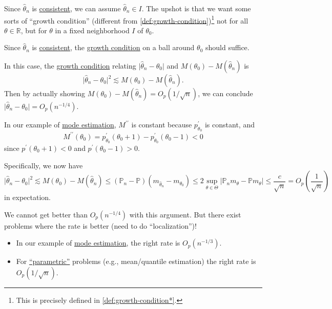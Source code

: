 Since \(\hat{\theta } _n \) is \hyperref[def:consistent]{consistent}, we can assume \(\hat{\theta } _n \in I\). The upshot is that we want some sorts of ``growth condition'' (different from \autoref{def:growth-condition})\footnote{This is precisely defined in \autoref{def:growth-condition*}.} not for all \(\theta \in \mathbb{R} \), but for \(\theta \) in a fixed neighborhood \(I\) of \(\theta _0\).

\begin{intuition}
	Since \(\hat{\theta } _n \) is \hyperref[def:consistent]{consistent}, the \hyperref[def:growth-condition*]{growth condition} on a ball around \(\theta _0\) should suffice.
\end{intuition}

In this case, the \hyperref[def:growth-condition*]{growth condition} relating \(\vert \hat{\theta } _n - \theta _0 \vert \) and \(M(\theta _0) - M(\hat{\theta} _n ) \) is
\[
	\vert \hat{\theta } _n - \theta _0 \vert ^2 \lesssim M(\theta _0) - M(\hat{\theta} _n ) .
\]
Then by actually showing \(M(\theta _0) - M(\hat{\theta} _n) = O_p(1 / \sqrt{n} )\), we can conclude \(\vert \hat{\theta } _n - \theta _0 \vert = O_p(n^{-1 / 4})\).

\begin{note}
	In our example of \hyperref[eg:mode-estimation]{mode estimation}, \(M^{\prime\prime} \) is constant because \(p_{\theta _0}^{\prime} \) is constant, and
	\[
		M^{\prime\prime} (\theta _0)
		= p_{\theta _0}^{\prime} (\theta _0 + 1) - p_{\theta _0}^{\prime} (\theta _0 - 1)
		< 0
	\]
	since \(p^{\prime} (\theta _0+1) < 0\) and \(p^{\prime} (\theta _0 - 1) > 0\).
\end{note}

Specifically, we now have
\[
	\vert \hat{\theta } _n - \theta _0 \vert ^2
	\lesssim M(\theta _0) - M(\hat{\theta } _n )
	\leq (\mathbb{P} _n - \mathbb{P} ) (m_{\hat{\theta } _n } - m_{\theta _0})
	\leq 2 \sup _{\theta \in \Theta } \vert \mathbb{P} _n m_\theta - \mathbb{P} m_\theta \vert
	\leq \frac{c}{\sqrt{n} }
	= O_p \left( \frac{1}{\sqrt{n} } \right)
\]
in expectation.

\begin{remark}
	We cannot get better than \(O_p(n^{-1 / 4})\) with this argument. But there exist problems where the rate is better (need to do ``localization'')!
	\begin{itemize}
		\item In our example of \hyperref[eg:mode-estimation]{mode estimation}, the right rate is \(O_p(n^{-1 / 3})\).
		\item For \hyperref[def:parametric]{``parametric''} problems (e.g., mean/quantile estimation) the right rate is \(O_p(1 / \sqrt{n} )\).
	\end{itemize}
\end{remark}

